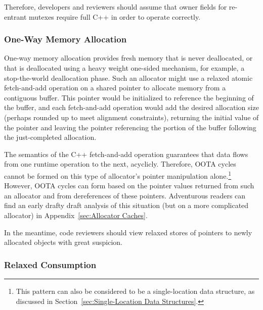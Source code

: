 \documentclass[10]{article}
\begin{document}

Therefore, developers and reviewers should assume that owner fields for
re-entrant mutexes require full C++ in order to operate correctly.

\subsubsection{One-Way Memory Allocation}
\label{sec:One-Way Memory Allocation}

One-way memory allocation provides fresh memory that is never deallocated,
or that is deallocated using a heavy weight one-sided mechanism, for
example, a stop-the-world deallocation phase.
Such an allocator might use a relaxed atomic fetch-and-add operation
on a shared pointer to allocate memory from a contiguous buffer.
This pointer would be initialized to reference the beginning of
the buffer, and each fetch-and-add operation would add the desired
allocation size (perhaps rounded up to meet alignment constraints),
returning the initial value of the pointer and leaving the pointer
referencing the portion of the buffer following the just-completed
allocation.

The semantics of the C++ fetch-and-add operation guarantees that
data flows from one runtime operation to the next, acyclicly.
Therefore, OOTA cycles cannot be formed on this type of allocator's
pointer manipulation alone.\footnote{
	This pattern can also be considered to be a
	single-location data structure, as discussed in
	Section~\ref{sec:Single-Location Data Structures}.}
However, OOTA cycles can form based on the pointer values returned from
such an allocator and from dereferences of these pointers.
Adventurous readers can find an early drafty draft analysis of this
situation (but on a more complicated allocator) in
Appendix~\ref{sec:Allocator Caches}.

In the meantime, code reviewers should view relaxed stores of pointers to
newly allocated objects with great suspicion.

\subsubsection{Relaxed Consumption}
\label{sec:Relaxed Consumption}
\end{document}
